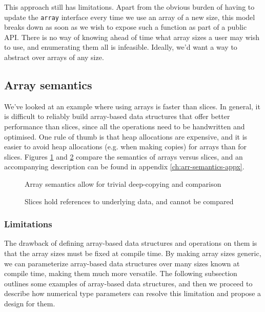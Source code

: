 
This approach still has limitations. Apart from the obvious burden of having to
update the \texttt{array} interface every time we use an array of a new size,
this model breaks down as soon as we wish to expose such a function as part of a
public API. There is no way of knowing ahead of time what array sizes a user may
wish to use, and enumerating them all is infeasible. Ideally, we'd want a way to
abstract over arrays of any size.

\subsection{Array semantics}

We've looked at an example where using arrays is faster than slices. In general,
it is difficult to reliably build array-based data structures that offer better
performance than slices, since all the operations need to be handwritten and
optimised. One rule of thumb is that heap allocations are expensive, and it is
easier to avoid heap allocations (e.g. when making copies) for arrays than for
slices. Figures \ref{lab:arr-semant} and \ref{lab:slice-semant} compare the
semantics of arrays versus slices, and an accompanying description can be found
in appendix \ref{ch:arr-semantics-appx}.

\begin{figure}
	\caption{Array semantics allow for trivial deep-copying and comparison}
	\label{lab:arr-semant}
\end{figure}

\begin{figure}
	\caption{Slices hold references to underlying data, and cannot be compared}
	\label{lab:slice-semant}
\end{figure}

\subsubsection{Limitations}

The drawback of defining array-based data structures and operations on them is
that the array sizes must be fixed at compile time. By making array sizes
generic, we can parameterize array-based data structures over many sizes known
at compile time, making them much more versatile. The following subsection
outlines some examples of array-based data structures, and then we proceed to
describe how numerical type parameters can resolve this limitation and propose a
design for them.

